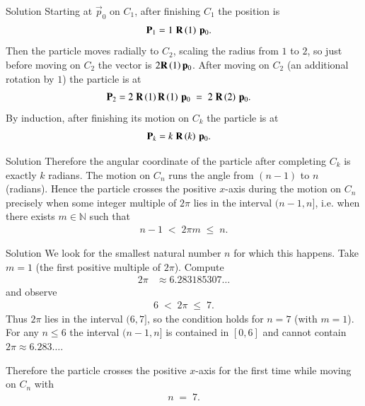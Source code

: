 \documentclass{beamer}
\begin{document}
\begin{frame}{Solution}
Starting at $\vec{p}_0$ on $C_1$, after finishing $C_1$ the position is
\begin{align}
    \mathbf{P}_1 &= 1\;\mathbf{R}\left(1\right)\,\mathbf{p}_0.
\end{align}
Then the particle moves radially to $C_2$, scaling the radius from $1$ to $2$, so just before moving on $C_2$ the vector is $2\mathbf{R}\left(1\right)\mathbf{p}_0$. After moving on $C_2$ (an additional rotation by $1$) the particle is at
\begin{align}
    \mathbf{P}_2 &= 2\;\mathbf{R}\left(1\right)\mathbf{R}\left(1\right)\,\mathbf{p}_0 \;=\; 2\;\mathbf{R}\left(2\right)\,\mathbf{p}_0.
\end{align}
By induction, after finishing its motion on $C_k$ the particle is at
\begin{align}
    \mathbf{P}_k &= k\;\mathbf{R}\left(k\right)\,\mathbf{p}_0.
\end{align}
\end{frame}

\begin{frame}{Solution}
Therefore the angular coordinate of the particle after completing $C_k$ is exactly $k$ radians.
The motion on $C_n$ runs the angle from $(n-1)$ to $n$ (radians).  
Hence the particle crosses the positive $x$-axis during the motion on $C_n$ precisely when some integer multiple of $2\pi$ lies in the interval $(n-1,n]$, i.e. when there exists $m\in\mathbb{N}$ such that
\begin{align}
    n-1 \;<\; 2\pi m \;\le\; n .
\end{align}
\end{frame}

\begin{frame}{Solution}
We look for the smallest natural number $n$ for which this happens.  
Take $m=1$ (the first positive multiple of $2\pi$). Compute
\begin{align}
    2\pi &\approx 6.283185307\ldots
\end{align}
and observe
\begin{align}
    6 \;<\; 2\pi \;\le\; 7.
\end{align}
Thus $2\pi$ lies in the interval $(6,7]$, so the condition holds for $n=7$ (with $m=1$).  
For any $n\le 6$ the interval $(n-1,n]$ is contained in $[0,6]$ and cannot contain $2\pi\approx 6.283\ldots$.

Therefore the particle crosses the positive $x$-axis for the first time while moving on $C_n$ with
\begin{align}
    \boxed{n \;=\; 7.}
\end{align}
\end{frame}
\end{document}
